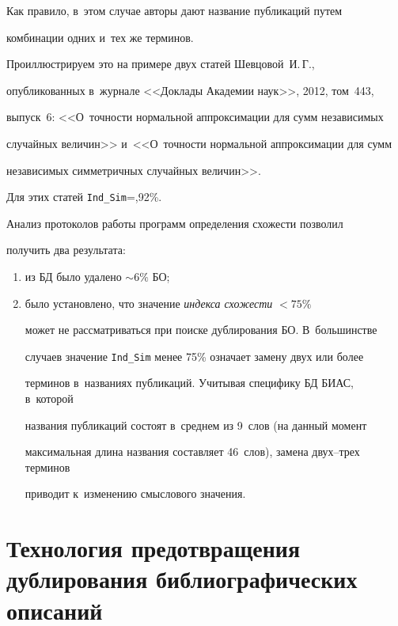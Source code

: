 {Как правило, в~этом случае авторы дают название публикаций путем


комбинации одних и~тех же терминов.





  Проиллюстрируем это на примере двух статей Шевцовой~И.\,Г.,


опубликованных в~журнале <<Доклады Академии наук>>, 2012, том~443,


выпуск~6:  <<О~точности нормальной аппроксимации для сумм независимых


случайных величин>> и~<<О~точности нормальной аппроксимации для сумм


независимых симметричных случайных величин>>.





  Для этих статей \verb"Ind_Sim"\;=,92\%.





  Анализ протоколов работы программ определения схожести позволил


получить два результата:


  \begin{enumerate}[(1)]


\item из БД было удалено $\sim 6\%$ БО;


\item было установлено, что значение \textit{индекса схожести} $< 75\%$


может не рас\-смат\-ри\-вать\-ся при поиске дублирования БО. В~большинстве


случаев значение \verb"Ind_Sim" менее 75\% означает замену двух или более


терминов в~названиях пуб\-ли\-ка\-ций. Учитывая специфику БД БИАС, в~которой


названия пуб\-ли\-ка\-ций состоят в~среднем из 9~слов (на данный момент


максимальная длина названия со\-став\-ля\-ет 46~слов), замена двух--трех терминов


приводит к~изменению смыслового значения.


\end{enumerate}





\section{Технология предотвращения дублирования библиографических описаний}





}
